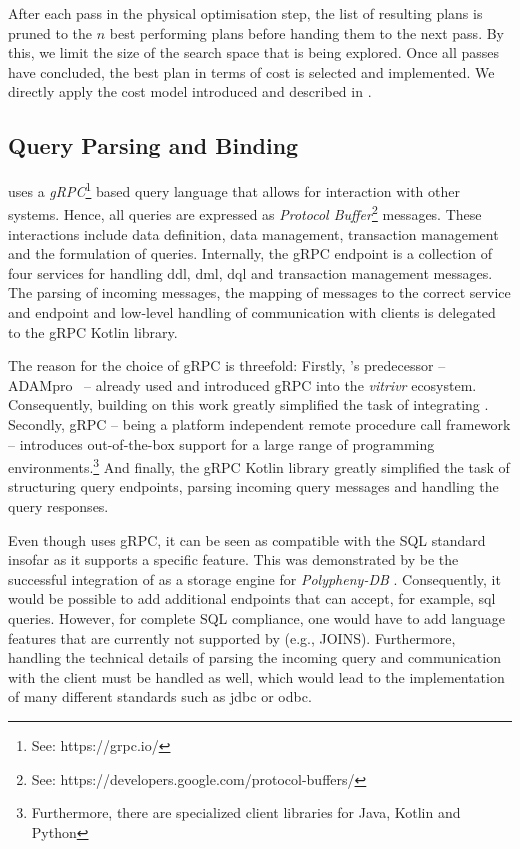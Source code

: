 After each pass in the physical optimisation step, the list of resulting plans is pruned to the $n$ best performing plans before handing them to the next pass. By this, we limit the size of the search space that is being explored. Once all passes have concluded, the best plan in terms of cost is selected and implemented. We directly apply the cost model introduced and described in .

\subsection{Query Parsing and Binding}
\cottontail{} uses a \emph{gRPC}\footnote{See: https://grpc.io/} based query language that allows for interaction with other systems. Hence, all queries are expressed as \emph{Protocol Buffer}\footnote{See: https://developers.google.com/protocol-buffers/} messages. These interactions include data definition, data management, transaction management and the formulation of queries. Internally, the gRPC endpoint is a collection of four services for handling \acrshort{ddl}, \acrshort{dml}, \acrshort{dql} and transaction management messages. The parsing of incoming messages, the mapping of messages to the correct service and endpoint and low-level handling of communication with clients is delegated to the gRPC Kotlin library. 

The reason for the choice of gRPC is threefold: Firstly, \cottontail{}'s predecessor -- ADAMpro~\cite{Giangreco:2016Adam} -- already used and introduced gRPC into the \emph{vitrivr} ecosystem. Consequently, building on this work greatly simplified the task of integrating \cottontail{}. Secondly, gRPC -- being a platform independent remote procedure call framework -- introduces out-of-the-box support for a large range of programming environments.\footnote{Furthermore, there are specialized client libraries for Java, Kotlin and Python} And finally, the gRPC Kotlin library greatly simplified the task of structuring query endpoints, parsing incoming query messages and handling the query responses.

Even though \cottontail{} uses gRPC, it can be seen as compatible with the SQL standard insofar as it supports a specific feature. This was demonstrated by be the successful integration of \cottontail{} as a storage engine for \emph{Polypheny-DB} \cite{Vogt:2018Polypheny,Vogt:2020Polypheny}. Consequently, it would be possible to add additional endpoints that can accept, for example, \acrshort{sql} queries. However, for complete SQL compliance, one would have to add language features that are currently not supported by \cottontail{} (e.g., JOINS). Furthermore, handling the technical details of parsing the incoming query and communication with the client must be handled as well, which would lead to the implementation of many different standards such as \acrshort{jdbc} or \acrshort{odbc}.


